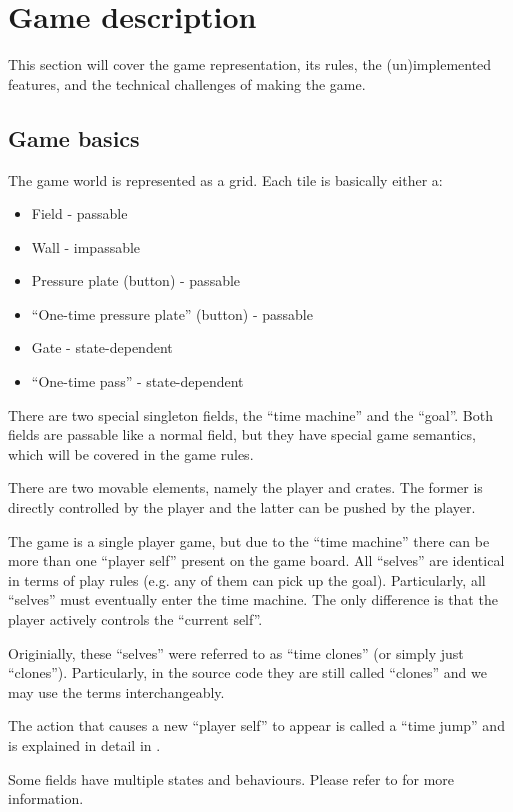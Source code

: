 \section{Game description}

This section will cover the game representation, its rules, the
(un)implemented features, and the technical challenges of making the
game.

\subsection{Game basics}
The game world is represented as a grid.  Each tile is basically
either a:

\begin{itemize}
\item Field - passable
\item Wall - impassable
\item Pressure plate (button) - passable
\item ``One-time pressure plate'' (button) - passable
\item Gate - state-dependent
\item ``One-time pass'' - state-dependent
\end{itemize}

There are two special singleton fields, the ``time machine'' and
the ``goal''.  Both fields are passable like a normal field, but
they have special game semantics, which will be covered in the
game rules.

There are two movable elements, namely the player and crates.  The
former is directly controlled by the player and the latter can be
pushed by the player.

The game is a single player game, but due to the ``time machine''
there can be more than one ``player self'' present on the game board.
All ``selves'' are identical in terms of play rules (e.g. any of
them can pick up the goal).  Particularly, all ``selves'' must
eventually enter the time machine.  The only difference is that the
player actively controls the ``current self''.

Originially, these ``selves'' were referred to as ``time clones'' (or
simply just ``clones'').  Particularly, in the source code they are
still called ``clones'' and we may use the terms interchangeably.

The action that causes a new ``player self'' to appear is called a
``time jump'' and is explained in detail in .

Some fields have multiple states and behaviours.  Please refer to
 for more information.

